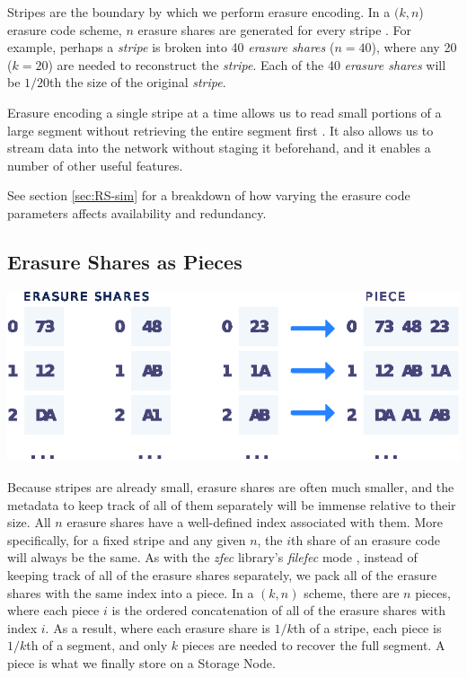 \documentclass[8pt,fleqn,openany]{book}
\begin{document}
Stripes are the boundary by which we perform erasure encoding.
In a $(k, n$) erasure code scheme, $n$ erasure shares are generated for
every stripe \cite{rs}.
For example, perhaps a {\em stripe} is broken into 40 {\em erasure shares}
($n=40$), where any 20 ($k=20$) are needed to reconstruct the {\em stripe}. Each
of the 40 {\em erasure shares} will be $1/20$th the size of the original
{\em stripe}.

Erasure encoding
a single stripe at a time allows us to read small portions of a
large segment without retrieving the entire segment first \cite{rs-cd}.
It also allows us to stream data into the
network without staging it beforehand, and it enables a number of other useful
features.

See section \ref{sec:RS-sim} for a breakdown of how varying the erasure code
parameters affects availability and redundancy.

\subsection{Erasure Shares as Pieces}\label{erasure-shares-as-pieces}

\begin{center}
\includegraphics[width=.6\textwidth]{images/share-piece.eps}
\end{center}

Because stripes are already small, erasure shares are often much
smaller, and the metadata to keep track of all of them separately will be
immense relative to their size.
All $n$ erasure shares have a well-defined index associated
with them. More specifically, for
a fixed stripe and any given $n$, the $i$th share of an erasure
code will always be the same.
As with the {\em zfec} library's {\em filefec} mode \cite{filefec-packing},
instead of keeping track of all of the
erasure shares separately, we pack all of the erasure shares with the
same index into a piece.
In a $(k, n)$ scheme, there are $n$ pieces, where each
piece $i$ is the ordered concatenation of all of the erasure shares with
index $i$. As a result, where each erasure share is $1/k$th of a
stripe, each piece is $1/k$th of a segment, and only $k$
pieces are needed to recover the full segment.
A piece is what
we finally store on a Storage Node.
\end{document}
